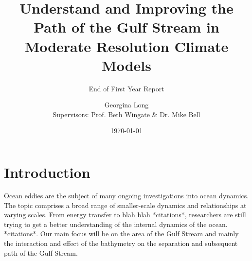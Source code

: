 \documentclass[a4paper,11pt]{article}
\title{Understand and Improving the Path of the Gulf Stream in Moderate Resolution Climate Models}
\subtitle{End of First Year Report}
\author{Georgina Long \\ Supervisors: Prof. Beth Wingate \& Dr. Mike Bell}
\date{\mydate\today}
\begin{document}

\maketitle

\section{Introduction}

Ocean eddies are the subject of many ongoing investigations into ocean dynamics. The topic comprises a broad range of smaller-scale dynamics and relationships at varying scales. From energy transfer to blah blah *citations*, researchers are still trying to get a better understanding of the internal dynamics of the ocean. *citations*. Our main focus will be on the area of the Gulf Stream and mainly the interaction and effect of the bathymetry on the separation and subsequent path of the Gulf Stream.
\end{document}
